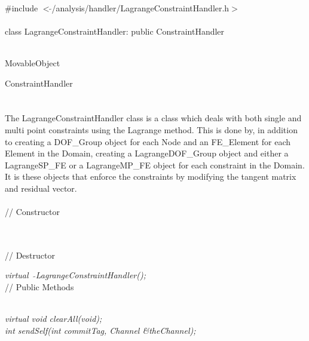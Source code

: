 
   \\
\indent \#include $<\tilde{
}$/analysis/handler/LagrangeConstraintHandler.h$>$  \\ 

  \\
class LagrangeConstraintHandler: public ConstraintHandler  


 \\
MovableObject 

\indent\indent ConstraintHandler \\
\indent\indent{} \\

 \\ 
\indent The LagrangeConstraintHandler class is a class which deals with
both single and multi point constraints using the Lagrange
method. This is done by, in addition to creating a DOF\_Group object
for each Node and an FE\_Element for each Element in the Domain,
creating a LagrangeDOF\_Group object and either a LagrangeSP\_FE or a
LagrangeMP\_FE object for each constraint in the Domain. It is these
objects that enforce the constraints by modifying the tangent matrix
and residual vector. \\ 


 \\
// Constructor 

\\  \\ 
// Destructor 

{\em virtual~ $\tilde{}$LagrangeConstraintHandler();}\\  

// Public Methods

 \\ 
{\em virtual void clearAll(void);} \\ 

{\em int sendSelf(int commitTag, Channel \&theChannel); } 

 \\



